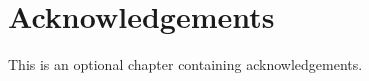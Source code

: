 \chapter*{Acknowledgements}
\label{acknowledgements}

This is an optional chapter containing acknowledgements.
